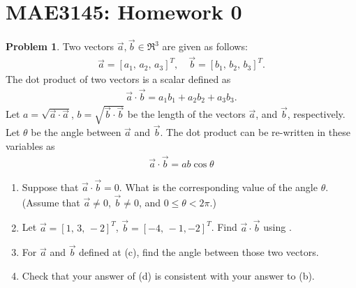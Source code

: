 \documentclass[10pt]{article}
\date{}
\theoremstyle{definition}
\newtheorem{prob}{Problem}[section]
\newenvironment{subprob}%
{\renewcommand{\theenumi}{\alph{enumi}}\renewcommand{\labelenumi}{(\theenumi)}\begin{enumerate}}%
{\end{enumerate}}%
\begin{document}
\pagestyle{empty}
\section*{MAE3145: Homework 0}
\vspace*{-0.4cm}


\begin{prob}
Two vectors $\vec a,\vec b\in\Re^3$ are given as follows:
\begin{align*}
\vec a = [a_1,\,a_2,\, a_3]^T,\quad \vec b = [b_1,\,b_2,\, b_3]^T.
\end{align*}
The dot product of two vectors is a scalar defined as
\begin{align}
\vec a \cdot \vec b = a_1b_1+a_2b_2+a_3b_3.\label{eqn:dot1}
\end{align}
Let $a=\sqrt{\vec a \cdot \vec a}$,\; $b=\sqrt{\vec b \cdot \vec b}$\; be the length of the vectors $\vec a$, and $\vec b$, respectively. Let $\theta$ be the angle between $\vec a$ and $\vec b$. The dot product can be re-written in these variables as
\begin{align}
\vec a \cdot \vec b = a b \cos\theta
\end{align}

\begin{subprob}
\item Suppose that $\vec a\cdot\vec b =0$. What is the corresponding value of the angle $\theta$. (Assume that $\vec a\neq 0$, $\vec b\neq 0$, and $0\leq\theta < 2 \pi$.)
\item Let $\vec a = [1,\,3,\,-2]^T$, $\vec b =[-4,\,-1,-2]^T$. Find $\vec a \cdot \vec b$ using .
\item For $\vec a$ and $\vec b$ defined at (c), find the angle between those two vectors.
\item Check that your answer of (d) is consistent with your answer to (b).
\end{subprob}


\end{prob}
\end{document}
